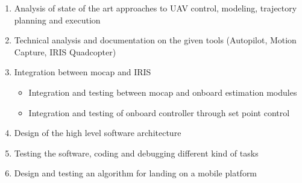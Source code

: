 \begin{enumerate}

\item Analysis of state of the art approaches to UAV control, modeling, trajectory planning and execution

\item Technical analysis and documentation on the given tools (Autopilot, Motion Capture, IRIS Quadcopter)

\item Integration between mocap and IRIS
\begin{itemize}

\item Integration and testing between mocap and onboard estimation modules
\item Integration and testing of onboard controller through set point control

\end{itemize}

\item Design of the high level software architecture 
\item Testing the software, coding and debugging different kind of tasks
\item Design and testing an algorithm for landing on a mobile platform

\end{enumerate}
















